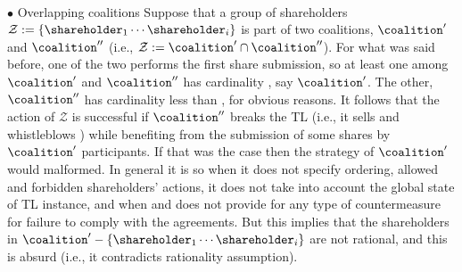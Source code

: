 \\
$\bullet$ Overlapping coalitions
\newline
Suppose that a group of shareholders $\mathcal{Z} := \{ \shareholder_1 \cdots \shareholder_{i} \}$ is part of two coalitions, $\coalition^\prime$ and $\coalition^{\prime\prime}$ (i.e., $\mathcal{Z} := \coalition^\prime \cap \coalition^{\prime\prime}$).
For what was said before, one of the two performs the first share submission, so at least one among $\coalition^\prime$ and $\coalition^{\prime\prime}$ has cardinality \K, say $\coalition^\prime$.
The other, $\coalition^{\prime\prime}$ has cardinality less than \K, for obvious reasons.
%
It follows that the action of $\mathcal{Z}$ is successful if $\coalition^{\prime\prime}$ breaks the TL (i.e., it sells and whistleblows \secret) while benefiting from the submission of some shares by $\coalition^\prime$ participants.
If that was the case then the strategy of $\coalition^\prime$ would malformed.
In general it is so when it does not specify ordering, allowed and forbidden shareholders' actions, it does not take into account the global state of TL instance, and when and does not provide for any type of countermeasure for failure to comply with the agreements. 
But this implies that the shareholders in $\coalition^\prime - \{ \shareholder_1 \cdots \shareholder_{i} \}$ are not rational, and this is absurd (i.e., it contradicts rationality assumption).








